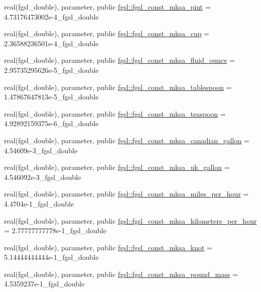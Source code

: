 \begin{DoxyCompactItemize}
\item 
real(fgsl\+\_\+double), parameter, public \hyperlink{namespacefgsl_a11b62fc3ced19e2c4f1ad227de09f9f0}{fgsl\+::fgsl\+\_\+const\+\_\+mksa\+\_\+pint} = 4.\+73176473002e-\/4\+\_\+fgsl\+\_\+double
\item 
real(fgsl\+\_\+double), parameter, public \hyperlink{namespacefgsl_af7eed4749b386e3a913ae8e18cadc2bc}{fgsl\+::fgsl\+\_\+const\+\_\+mksa\+\_\+cup} = 2.\+36588236501e-\/4\+\_\+fgsl\+\_\+double
\item 
real(fgsl\+\_\+double), parameter, public \hyperlink{namespacefgsl_af688bbef5ebab7dfd674fad9cf5d8bd3}{fgsl\+::fgsl\+\_\+const\+\_\+mksa\+\_\+fluid\+\_\+ounce} = 2.\+95735295626e-\/5\+\_\+fgsl\+\_\+double
\item 
real(fgsl\+\_\+double), parameter, public \hyperlink{namespacefgsl_abb32761f02e5a238d65d6c3e48c1c2b9}{fgsl\+::fgsl\+\_\+const\+\_\+mksa\+\_\+tablespoon} = 1.\+47867647813e-\/5\+\_\+fgsl\+\_\+double
\item 
real(fgsl\+\_\+double), parameter, public \hyperlink{namespacefgsl_aa58032e706375dbeb56727446a0ffea1}{fgsl\+::fgsl\+\_\+const\+\_\+mksa\+\_\+teaspoon} = 4.\+92892159375e-\/6\+\_\+fgsl\+\_\+double
\item 
real(fgsl\+\_\+double), parameter, public \hyperlink{namespacefgsl_a12f46f464315290d696dc0dd7d011aaf}{fgsl\+::fgsl\+\_\+const\+\_\+mksa\+\_\+canadian\+\_\+gallon} = 4.\+54609e-\/3\+\_\+fgsl\+\_\+double
\item 
real(fgsl\+\_\+double), parameter, public \hyperlink{namespacefgsl_a15754665dbe5dc6a4976466a653b27a3}{fgsl\+::fgsl\+\_\+const\+\_\+mksa\+\_\+uk\+\_\+gallon} = 4.\+546092e-\/3\+\_\+fgsl\+\_\+double
\item 
real(fgsl\+\_\+double), parameter, public \hyperlink{namespacefgsl_a66a4e29fec2be328384363b6a5b3efcd}{fgsl\+::fgsl\+\_\+const\+\_\+mksa\+\_\+miles\+\_\+per\+\_\+hour} = 4.\+4704e-\/1\+\_\+fgsl\+\_\+double
\item 
real(fgsl\+\_\+double), parameter, public \hyperlink{namespacefgsl_ae0c1239a6941272700558b0eaf053137}{fgsl\+::fgsl\+\_\+const\+\_\+mksa\+\_\+kilometers\+\_\+per\+\_\+hour} = 2.\+77777777778e-\/1\+\_\+fgsl\+\_\+double
\item 
real(fgsl\+\_\+double), parameter, public \hyperlink{namespacefgsl_a36e83219d4dc03eaba28ee2ee6636c56}{fgsl\+::fgsl\+\_\+const\+\_\+mksa\+\_\+knot} = 5.\+14444444444e-\/1\+\_\+fgsl\+\_\+double
\item 
real(fgsl\+\_\+double), parameter, public \hyperlink{namespacefgsl_ad3cb7ad76502d5665ed74c2306e2b5f2}{fgsl\+::fgsl\+\_\+const\+\_\+mksa\+\_\+pound\+\_\+mass} = 4.\+5359237e-\/1\+\_\+fgsl\+\_\+double

\end{DoxyCompactItemize}
